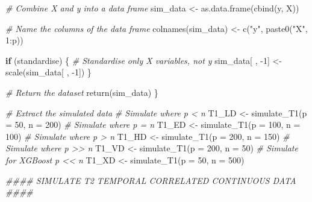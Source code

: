 \documentclass[
  11pt,
]{article}
\newenvironment{Shaded}{}{}
\newcommand{\AttributeTok}[1]{\textcolor[rgb]{0.49,0.56,0.16}{#1}}
\newcommand{\CommentTok}[1]{\textcolor[rgb]{0.38,0.63,0.69}{\textit{#1}}}
\newcommand{\ControlFlowTok}[1]{\textcolor[rgb]{0.00,0.44,0.13}{\textbf{#1}}}
\newcommand{\DecValTok}[1]{\textcolor[rgb]{0.25,0.63,0.44}{#1}}
\newcommand{\DocumentationTok}[1]{\textcolor[rgb]{0.73,0.13,0.13}{\textit{#1}}}
\newcommand{\FunctionTok}[1]{\textcolor[rgb]{0.02,0.16,0.49}{#1}}
\newcommand{\NormalTok}[1]{#1}
\newcommand{\OtherTok}[1]{\textcolor[rgb]{0.00,0.44,0.13}{#1}}
\newcommand{\SpecialCharTok}[1]{\textcolor[rgb]{0.25,0.44,0.63}{#1}}
\newcommand{\StringTok}[1]{\textcolor[rgb]{0.25,0.44,0.63}{#1}}
\begin{document}
\begin{Shaded}
\begin{Highlighting}[]
  \CommentTok{\# Combine X and y into a data frame}
\NormalTok{  sim\_data }\OtherTok{\textless{}{-}} \FunctionTok{as.data.frame}\NormalTok{(}\FunctionTok{cbind}\NormalTok{(y, X))}
  
  \CommentTok{\# Name the columns of the data frame}
  \FunctionTok{colnames}\NormalTok{(sim\_data) }\OtherTok{\textless{}{-}} \FunctionTok{c}\NormalTok{(}\StringTok{"y"}\NormalTok{, }\FunctionTok{paste0}\NormalTok{(}\StringTok{"X"}\NormalTok{, }\DecValTok{1}\SpecialCharTok{:}\NormalTok{p))}
  
  \ControlFlowTok{if}\NormalTok{ (standardise) \{}
    \CommentTok{\# Standardise only X variables, not y}
\NormalTok{    sim\_data[ , }\SpecialCharTok{{-}}\DecValTok{1}\NormalTok{] }\OtherTok{\textless{}{-}} \FunctionTok{scale}\NormalTok{(sim\_data[ , }\SpecialCharTok{{-}}\DecValTok{1}\NormalTok{])}
\NormalTok{  \}}
  
  \CommentTok{\# Return the dataset}
  \FunctionTok{return}\NormalTok{(sim\_data)}
\NormalTok{\}}

\CommentTok{\# Extract the simulated data}
\CommentTok{\# Simulate where p \textless{} n}
\NormalTok{T1\_LD }\OtherTok{\textless{}{-}} \FunctionTok{simulate\_T1}\NormalTok{(}\AttributeTok{p =} \DecValTok{50}\NormalTok{, }\AttributeTok{n =} \DecValTok{200}\NormalTok{)}
\CommentTok{\# Simulate where p = n}
\NormalTok{T1\_ED }\OtherTok{\textless{}{-}} \FunctionTok{simulate\_T1}\NormalTok{(}\AttributeTok{p =} \DecValTok{100}\NormalTok{, }\AttributeTok{n =} \DecValTok{100}\NormalTok{)}
\CommentTok{\# Simulate where p \textgreater{} n}
\NormalTok{T1\_HD }\OtherTok{\textless{}{-}} \FunctionTok{simulate\_T1}\NormalTok{(}\AttributeTok{p =} \DecValTok{200}\NormalTok{, }\AttributeTok{n =} \DecValTok{150}\NormalTok{)}
\CommentTok{\# Simulate where p \textgreater{}\textgreater{} n}
\NormalTok{T1\_VD }\OtherTok{\textless{}{-}} \FunctionTok{simulate\_T1}\NormalTok{(}\AttributeTok{p =} \DecValTok{200}\NormalTok{, }\AttributeTok{n =} \DecValTok{50}\NormalTok{)}
\CommentTok{\# Simulate for XGBoost p \textless{}\textless{} n}
\NormalTok{T1\_XD }\OtherTok{\textless{}{-}} \FunctionTok{simulate\_T1}\NormalTok{(}\AttributeTok{p =} \DecValTok{50}\NormalTok{, }\AttributeTok{n =} \DecValTok{500}\NormalTok{)}

\DocumentationTok{\#\#\#\# SIMULATE T2 TEMPORAL CORRELATED CONTINUOUS DATA \#\#\#\#}


\end{Highlighting}
\end{Shaded}
\end{document}
